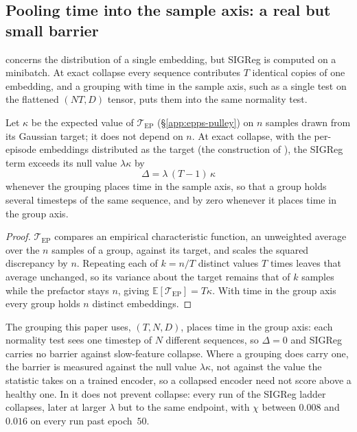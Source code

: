 \subsection{Pooling time into the sample axis: a real but small barrier}
\label{app:sf-barrier}

 concerns the distribution of a single embedding, but SIGReg is computed on a minibatch. At exact collapse every sequence contributes $T$ identical copies of one embedding, and a grouping with time in the sample axis, such as a single test on the flattened $(NT, D)$
tensor, puts them into the same normality test.

\begin{proposition}
\label{prop:sf-barrier}
Let $\kappa$ be the expected value of $\mathcal{T}_{\mathrm{EP}}$ (\S\ref{app:epps-pulley}) on $n$
samples drawn from its Gaussian target; it does not depend on $n$. At exact collapse, with the per-episode embeddings distributed as the target (the construction of ), the SIGReg term exceeds its null value $\lambda\kappa$ by
\begin{equation}
\label{eq:sf-barrier}
\Delta = \lambda\,(T-1)\,\kappa
\end{equation}
whenever the grouping places time in the sample axis, so that a group holds several
timesteps of the same sequence, and by zero whenever it places time in the group axis.
\end{proposition}

\begin{proof}
$\mathcal{T}_{\mathrm{EP}}$ compares an empirical characteristic function, an unweighted average over the $n$ samples of a group, against its target, and scales the squared discrepancy by $n$. Repeating each of $k = n/T$ distinct values $T$ times leaves that average unchanged, so its variance about the target remains that of $k$ samples while the prefactor stays $n$, giving $\mathbb{E}[\mathcal{T}_{\mathrm{EP}}] = T\kappa$. With time in the group axis every group holds $n$ distinct embeddings.
\end{proof}

The grouping this paper uses, $(T,N,D)$, places time in the group axis: each normality test
sees one timestep of $N$ different sequences, so $\Delta = 0$ and SIGReg carries no barrier
against slow-feature collapse. Where a grouping does carry one, the barrier is
measured against the null value $\lambda\kappa$, not against the value the statistic takes
on a trained encoder, so a collapsed encoder need not score above a healthy one.
In  it does not prevent collapse: every run of the SIGReg ladder collapses,
later at larger $\lambda$ but to the same endpoint, with $\chi$ between $0.008$ and $0.016$
on every run past epoch~$50$.

